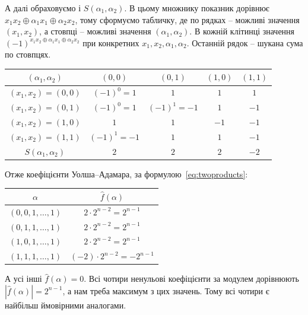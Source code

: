 А далі обраховуємо і $S(\alpha_1, \alpha_2)$. В цьому множнику показник дорівнює $x_1 x_2 \oplus \alpha_1 x_1 \oplus \alpha_2 x_2$, 
тому сформуємо табличку, де по рядках -- можливі значення $(x_{1}, x_{2})$, а стовпці -- можливі значення 
$(\alpha_1,\alpha_2)$. В кожній клітинці значення $(-1)^{x_1 x_2 \oplus \alpha_1 x_1 \oplus \alpha_2 x_2}$ 
при конкретних $x_{1}, x_{2}, \alpha_{1}, \alpha_{2}$. Останній рядок -- шукана сума по стовпцях.

\begin{center}
    \renewcommand{\arraystretch}{1.2}
    \begin{tabular}{c|cccc}
        $(\alpha_1,\alpha_2)$  & $(0,0)$     & $(0,1)$     & $(1,0)$ & $(1,1)$ \\
        \hline
        $(x_1,x_2)=(0,0)$      & $(-1)^0=1$  & $1$         & $1$     & $1$     \\
        $(x_1,x_2)=(0,1)$      & $(-1)^0=1$  & $(-1)^1=-1$ & $1$     & $-1$    \\
        $(x_1,x_2)=(1,0)$      & $1$         & $1$         & $-1$    & $-1$    \\
        $(x_1,x_2)=(1,1)$      & $(-1)^1=-1$ & $1$         & $1$     & $-1$    \\
        \hline
        $S(\alpha_1,\alpha_2)$ & $2$         & $2$         & $2$     & $-2$
    \end{tabular}
\end{center}
Отже коефіцієнти Уолша--Адамара, за формулою~\eqref{eq:twoproducts}:
\begin{center}
    \renewcommand{\arraystretch}{1.3}
    \begin{tabular}{c|c}
        $\alpha$               & $\hat{f}(\alpha)$ \\
        \hline
        $(0, 0, 1, \ldots, 1)$ & $2 \cdot 2^{n-2}    = 2^{n-1}$         \\
        $(0, 1, 1, \ldots, 1)$ & $2 \cdot 2^{n-2}    = 2^{n-1}$         \\
        $(1, 0, 1, \ldots, 1)$ & $2 \cdot 2^{n-2}    = 2^{n-1}$         \\
        $(1, 1, 1, \ldots, 1)$ & $(-2) \cdot 2^{n-2}  = -2^{n-1}$        \\
    \end{tabular}
\end{center}
А усі інші $\hat{f}(\alpha) = 0$. Всі чотири ненульові коефіцієнти за модулем дорівнюють $|\hat{f}(\alpha)| = 2^{n-1}$, 
а нам треба максимум з цих значень. Тому всі чотири є найбільш ймовірними аналогами.

